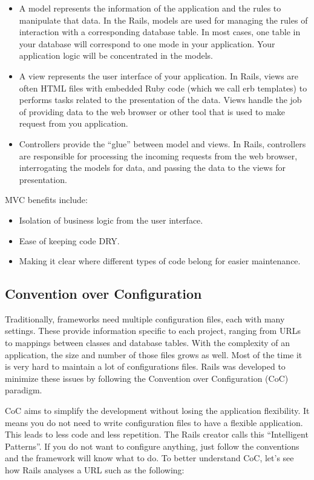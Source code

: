 \begin{itemize}
\item A model represents the information of the application and the rules to manipulate that data. In the Rails, models are used for managing the rules of interaction with a corresponding database table. In most cases, one table in your database will correspond to one mode in your application. Your application logic will be concentrated in the models.
\item A view represents the user interface of your application. In Rails, views are often HTML files with embedded Ruby code (which we call erb templates) to performs tasks related to the presentation of the data. Views handle the job of providing data to the web browser or other tool that is used to make request from you application.
\item Controllers provide the “glue” between model and views. In Rails, controllers are responsible for processing the incoming requests from the web browser, interrogating the models for data, and passing the data to the views for presentation.
\end{itemize}

MVC benefits include: 
\begin{itemize}
\item Isolation of business logic from the user interface.
\item Ease of keeping code DRY.
\item Making it clear where different types of code belong for easier maintenance.
\end{itemize}






\subsection{Convention over Configuration} 
Traditionally, frameworks need multiple configuration files, each with many settings. 
These provide information specific to each project, ranging from URLs to mappings between classes and database tables. 
With the complexity of an application, the size and number of those files grows as well. 
Most of the time it is very hard to maintain a lot of configurations files. 
Rails was developed to minimize these issues by following the Convention over Configuration (CoC) paradigm.

CoC aims to simplify the development without losing the application flexibility. 
It means you do not need to write configuration files to have a flexible application. 
This leads to less code and less repetition.
The Rails creator calls this “Intelligent Patterns”. 
If you do not want to configure anything, just follow the conventions and the framework will know what to do.
To better understand CoC, let's see how Rails analyses a URL such as the following:

